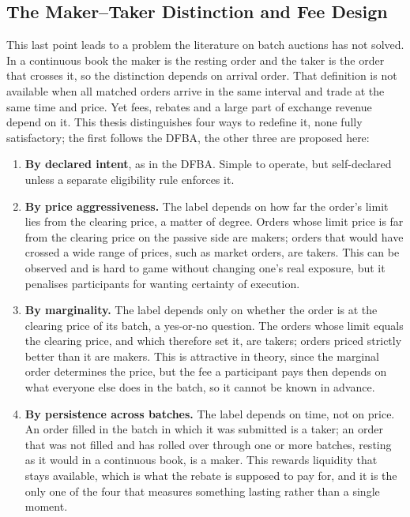 \subsection{The Maker--Taker Distinction and Fee Design}

This last point leads to a problem the literature on batch auctions has not
solved. In a continuous book the maker is the resting order and the taker is
the order that crosses it, so the distinction depends on arrival order. That
definition is not available when all matched orders arrive in the same
interval and trade at the same time and price. Yet fees, rebates and a large
part of exchange revenue depend on it. This thesis distinguishes four ways
to redefine it, none fully satisfactory; the first follows the DFBA, the
other three are proposed here:

\begin{enumerate}
  \item \textbf{By declared intent}, as in the DFBA. Simple to operate, but
  self-declared unless a separate eligibility rule enforces it.
  \item \textbf{By price aggressiveness.} The label depends on how far the
  order's limit lies from the clearing price, a matter of degree. Orders
  whose limit price is far from the clearing price on the passive side are
  makers; orders that would have crossed a wide range of prices, such as
  market orders, are takers. This can be observed and is hard
  to game without changing one's real exposure, but it penalises participants
  for wanting certainty of execution.
  \item \textbf{By marginality.} The label depends only on whether the
  order is at the clearing price of its batch, a yes-or-no question. The
  orders whose limit equals the clearing price, and which therefore set it,
  are takers; orders priced strictly better than it are makers. This is
  attractive in theory, since the marginal order determines the price, but the
  fee a participant pays then depends on what everyone else does in the
  batch, so it cannot be known in advance.
  \item \textbf{By persistence across batches.} The label depends on time,
  not on price. An order filled in the batch in which it was submitted is a
  taker; an order that was not filled and has rolled over through one or
  more batches, resting as it would in a continuous book, is a maker. This rewards
  liquidity that stays available, which is what the rebate is supposed to pay
  for, and it is the only one of the four that measures something lasting
  rather than a single moment.
\end{enumerate}


